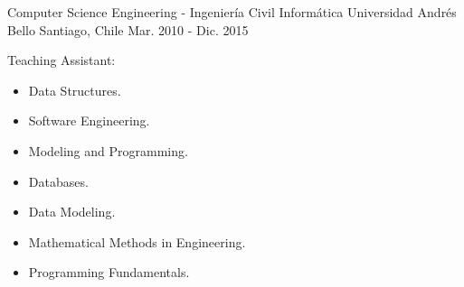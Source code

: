 

\begin{cventries}

  \cventry
    {Computer Science Engineering - Ingeniería Civil Informática} %
    {Universidad Andrés Bello} %
    {Santiago, Chile} %
    {Mar. 2010 - Dic. 2015} %
    {
     	\begin{cvitems} %
        	\item {Teaching Assistant:}
        		\begin{itemize}
        			\item {Data Structures.}
	        		\item {Software Engineering.}
        			\item {Modeling and Programming.}
        			\item {Databases.}
        			\item {Data Modeling.}
        			\item {Mathematical Methods in Engineering.}
        			\item {Programming Fundamentals.}
      		\end{itemize}
    	\end{cvitems}
    }
     

\end{cventries}
